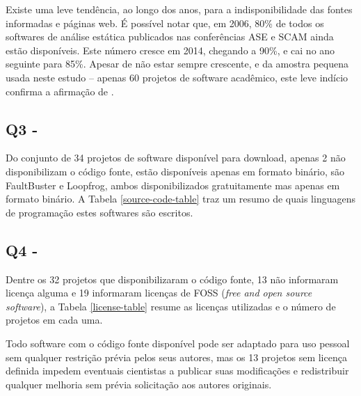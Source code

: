 Existe uma leve tendência, ao longo dos anos,  para a indisponibilidade das
fontes informadas e páginas web.  É possível notar que, em 2006, 80\% de todos
os softwares de análise estática publicados nas conferências ASE e SCAM ainda
estão disponíveis.  Este número cresce em 2014, chegando a 90\%, e cai no ano
seguinte para 85\%.  Apesar de não estar sempre crescente, e da  amostra
pequena usada neste estudo -- apenas 60 projetos de software acadêmico, este
leve indício confirma a afirmação de .

\subsection{Q3 - \EstudoUmQuestaoTres} %

Do conjunto de 34 projetos de software disponível para download, apenas 2 não
disponibilizam o código fonte, estão disponíveis apenas em formato binário, são
FaultBuster e Loopfrog, ambos disponibilizados gratuitamente mas apenas em
formato binário. A Tabela \ref{source-code-table} traz um resumo de quais
linguagens de programação estes softwares são escritos.




\subsection{Q4 - \EstudoUmQuestaoQuatro} %

Dentre os 32 projetos que disponibilizaram o código fonte, 13 não informaram
licença alguma e 19 informaram licenças de FOSS ({\it free and open source
software}), a Tabela \ref{license-table} resume as licenças utilizadas e o
número de projetos em cada uma.



Todo software com o código fonte disponível pode ser adaptado para uso pessoal
sem qualquer restrição prévia pelos seus autores, mas os 13 projetos sem
licença definida impedem eventuais cientistas a publicar suas modificações e
redistribuir qualquer melhoria sem prévia solicitação aos autores originais.

